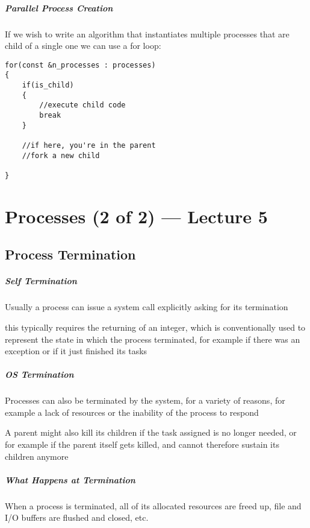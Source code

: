 \documentclass[openright, twoside]{report}
\theoremstyle{definition}
\theoremstyle{example}
\begin{document}
			\paragraph{Parallel Process Creation}
				If we wish to write an algorithm that instantiates multiple processes that 
				are child of a single one
				we can use a for loop:
				\begin{lstlisting}
for(const &n_processes : processes)
{
	if(is_child)
	{
		//execute child code 
		break
	}
	 
	//if here, you're in the parent 
	//fork a new child 

}
				\end{lstlisting}

\chapter{Processes (2 of 2) --- Lecture 5}
	\section{Process Termination}
			\label{sec:p_termination}
			\paragraph{Self Termination}
				Usually a process can issue a system call explicitly asking for its 
				termination 

				this typically requires the returning of an integer, which is 
				conventionally used to represent 
				the state in which the process terminated, for example if there was an exception or if it just finished 
				its tasks 

			\paragraph{OS Termination}
				Processes can also be terminated by the system, for a variety of reasons, for example a lack
				of resources or the inability of the process to respond 

				A parent might also kill its children if the task assigned is no longer needed, or for 
				example if the parent itself gets killed, and cannot therefore sustain its children anymore

			\paragraph{What Happens at Termination}
				When a process is terminated, all of its allocated resources are freed up, file 
				and I/O buffers are flushed and closed, etc. 
\end{document}
